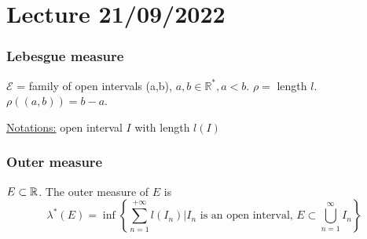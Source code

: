 \section{Lecture 21/09/2022}
\subsubsection*{Lebesgue measure}
\(\mathcal{E}\) = family of open intervals (a,b), \(a,b \in \mathbb{R}^*, a < b\). \(\rho =\) length \(l\).
\(\rho((a,b)) = b - a\). 

\noindent\underline{Notations:} open interval \(I\) with length \(l(I)\)
\subsubsection*{Outer measure}
\(E \subset \mathbb{R}\). The outer measure of \(E\) is 
\[
    \lambda^*(E) = \inf \left\lbrace \sum_{n=1}^{+\infty} l(I_n) \vert I_n \mbox{ is an open interval, } E \subset \bigcup_{n = 1}^{\infty} I_n \right\rbrace
\]
